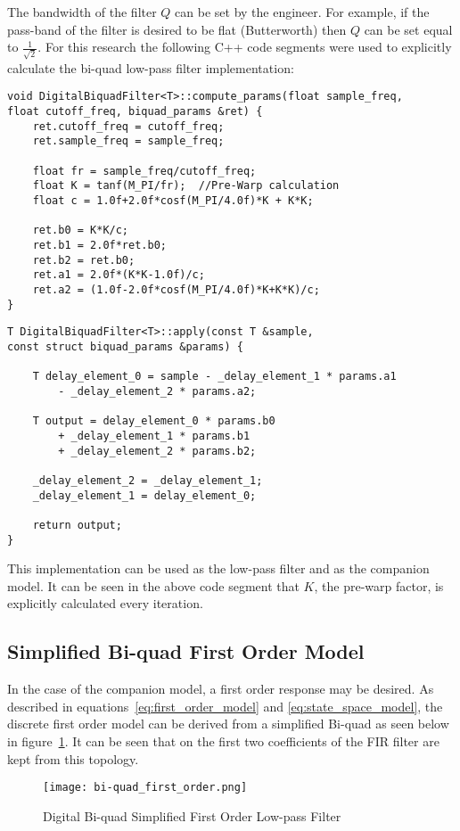 The bandwidth of the filter $Q$ can be set by the engineer.  For example, if the pass-band of the filter is desired to be flat (Butterworth) then $Q$ can be set equal to $\frac{1}{\sqrt{2}}$.  For this research the following C++ code segments were used to explicitly calculate the bi-quad low-pass filter implementation: \newline

\begin{lstlisting}
void DigitalBiquadFilter<T>::compute_params(float sample_freq, 
float cutoff_freq, biquad_params &ret) {
    ret.cutoff_freq = cutoff_freq;
    ret.sample_freq = sample_freq;

    float fr = sample_freq/cutoff_freq;
    float K = tanf(M_PI/fr);  //Pre-Warp calculation
    float c = 1.0f+2.0f*cosf(M_PI/4.0f)*K + K*K;

    ret.b0 = K*K/c;
    ret.b1 = 2.0f*ret.b0;
    ret.b2 = ret.b0;
    ret.a1 = 2.0f*(K*K-1.0f)/c;
    ret.a2 = (1.0f-2.0f*cosf(M_PI/4.0f)*K+K*K)/c;
}
\end{lstlisting}

\begin{lstlisting}
T DigitalBiquadFilter<T>::apply(const T &sample, 
const struct biquad_params &params) {
    
    T delay_element_0 = sample - _delay_element_1 * params.a1 
	    - _delay_element_2 * params.a2;
    
    T output = delay_element_0 * params.b0 
	    + _delay_element_1 * params.b1 
	    + _delay_element_2 * params.b2;

    _delay_element_2 = _delay_element_1;
    _delay_element_1 = delay_element_0;

    return output;
}

\end{lstlisting}

This implementation can be used as the \Lone low-pass filter and as the companion model.  It can be seen in the above code segment that $K$, the pre-warp factor, is explicitly calculated every iteration.

\subsection{Simplified Bi-quad First Order Model}

In the case of the companion model, a first order response may be desired.  As described in equations~\ref{eq:first_order_model} and \ref{eq:state_space_model}, the discrete first order model can be derived from a simplified Bi-quad as seen below in figure~\ref{fig:bi-quad_first_order}.  It can be seen that on the first two coefficients of the \ac{FIR} filter are kept from this topology.
\begin{figure}[h!]
 \centering
  \texttt{[image: bi-quad\_first\_order.png]}
  \caption{Digital Bi-quad Simplified First Order Low-pass Filter }
  \label{fig:bi-quad_first_order}
\end{figure}

